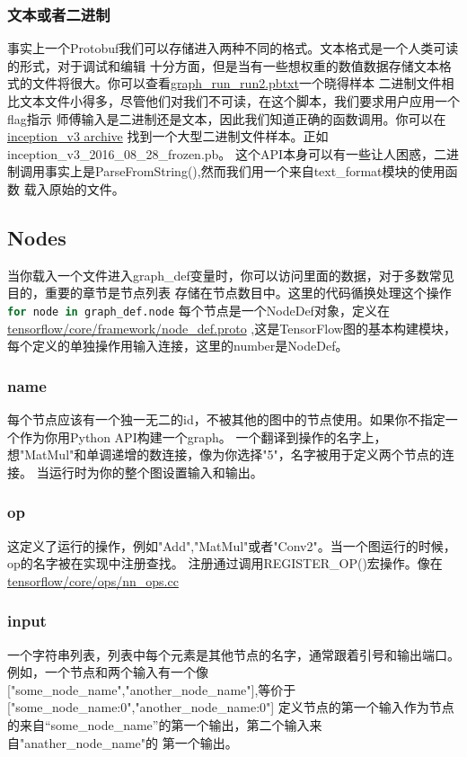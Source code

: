 \subsubsection{文本或者二进制}
事实上一个Protobuf我们可以存储进入两种不同的格式。文本格式是一个人类可读的形式，对于调试和编辑
十分方面，但是当有一些想权重的数值数据存储文本格式的文件将很大。你可以查看\href{https://github.com/tensorflow/tensorboard/blob/master/tensorboard/demo/data/graph_run_run2.pbtxt}{graph\_run\_run2.pbtxt}一个晓得样本
二进制文件相比文本文件小得多，尽管他们对我们不可读，在这个脚本，我们要求用户应用一个flag指示
师傅输入是二进制还是文本，因此我们知道正确的函数调用。你可以在\href{https://storage.googleapis.com/download.tensorflow.org/models/inception_v3_2016_08_28_frozen.pb.tar.gz}{inception\_v3 archive}
找到一个大型二进制文件样本。正如inception\_v3\_2016\_08\_28\_frozen.pb。
这个API本身可以有一些让人困惑，二进制调用事实上是ParseFromString(),然而我们用一个来自text\_format模块的使用函数
载入原始的文件。
\subsection{Nodes}
当你载入一个文件进入graph\_def变量时，你可以访问里面的数据，对于多数常见目的，重要的章节是节点列表
存储在节点数目中。这里的代码循换处理这个操作
\lstinline[language=Python]{for node in graph_def.node}
每个节点是一个NodeDef对象，定义在\href{https://github.com/tensorflow/tensorflow/blob/master/tensorflow/core/framework/node_def.proto}{tensorflow/core/framework/node\_def.proto}
,这是TensorFlow图的基本构建模块，每个定义的单独操作用输入连接，这里的number是NodeDef。
\subsubsection{name}
每个节点应该有一个独一无二的id，不被其他的图中的节点使用。如果你不指定一个作为你用Python API构建一个graph。
一个翻译到操作的名字上，想"MatMul"和单调递增的数连接，像为你选择"5"，名字被用于定义两个节点的连接。
当运行时为你的整个图设置输入和输出。
\subsubsection{op}
这定义了运行的操作，例如"Add","MatMul"或者"Conv2"。当一个图运行的时候，op的名字被在实现中注册查找。
注册通过调用REGISTER\_OP()宏操作。像在
\href{https://github.com/tensorflow/tensorflow/blob/master/tensorflow/core/ops/nn\_ops.cc}{tensorflow/core/ops/nn\_ops.cc}
\subsubsection{input}
一个字符串列表，列表中每个元素是其他节点的名字，通常跟着引号和输出端口。例如，一个节点和两个输入有一个像
["some\_node\_name","another\_node\_name"],等价于["some\_node\_name:0","another\_node\_name:0"]
定义节点的第一个输入作为节点的来自“some\_node\_name”的第一个输出，第二个输入来自"anather\_node\_name"的
第一个输出。
